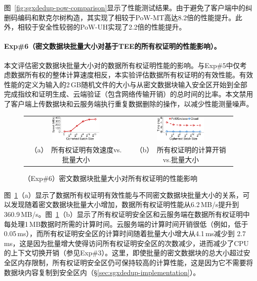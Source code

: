 图~\ref{fig:sgxdedup-pow-comparison}显示了性能测试结果。由于\sysnameS 避免了客户端中的纠删码编码和默克尔树构造，其实现了相较于PoW-MT高达8.2倍的性能提升。此外，\sysnameS 相较于安全性较弱的PoW-UH实现了2.2倍的性能提升。

\paragraph*{Exp\#6（密文数据块批量大小对基于TEE的所有权证明的性能影响）。}本文评估密文数据块批量大小对\sysnameS 的数据所有权证明性能的影响。与Exp\#5中仅考虑数据所有权的整体计算速度相反，本实验评估数据所有权证明的有效性能。有效性能的定义为输入的2\,GB随机文件的大小与从密文数据块输入安全区开始到全部完成指纹和证明生成、云端验证（包含网络传输开销）的总时间的比率。本文禁用了客户端上传数据块和云服务端执行重复数据删除的操作，以减少性能测量噪声。

\begin{figure}[!htb]
    \centering
    \begin{tabular}{@{\ }c@{\ }c}
        \includegraphics[width=0.48\textwidth]{pic/sgxdedup/expa4_powBatchSize_overall.pdf} &
        \includegraphics[width=0.48\textwidth]{pic/sgxdedup/expa4_powBatchSize_breakdown.pdf} \\
        \mbox{\parbox{0.48\textwidth}{\small （a） 所有权证明有效速度vs.批量大小}} &
        \mbox{\parbox{0.48\textwidth}{\small （b） 所有权证明的计算开销vs.批量大小}}
    \end{tabular}
    \caption{（Exp\#6）密文数据块批量大小对所有权证明的性能影响}
    \label{fig:sgxdedup-exp-pow-impact}
\end{figure}

图~\ref{fig:sgxdedup-exp-pow-impact}（a）显示了数据所有权证明有效性能与不同密文数据块批量大小的关系，可以发现随着密文数据块批量大小增加，数据所有权证明性能从6.2\,MB/s提升到360.9\,MB/s。图~\ref{fig:sgxdedup-exp-pow-impact}（b）显示了所有权证明安全区和云服务端在数据所有权证明中每处理1\,MB数据时所需的计算时间。云服务端的计算时间开销很低（例如，低于0.05\,ms），而所有权证明安全区的计算时间随着批量大小增大从4.1\,ms减少到 2.7\,ms，这是因为批量增大使得访问所有权证明安全区的次数减少，进而减少了CPU的上下文切换开销（参见Exp\#3）。这里，即使批量的密文数据块的总大小超过安全区内存限制，所有权证明安全区仍可保持较高的计算性能，这是因为它不需要将数据块内容复制到安全区内（\S\ref{sec:sgxdedup-implementation}）。


